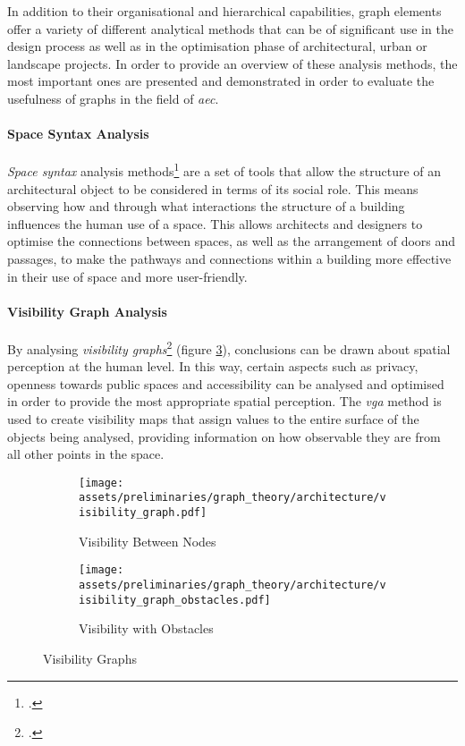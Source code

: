 \documentclass[a4paper, 12pt]{report}
\begin{document}
In addition to their organisational and hierarchical capabilities, graph elements offer a variety of different analytical methods that can be of significant use in the design process as well as in the optimisation phase of architectural, urban or landscape projects. In order to provide an overview of these analysis methods, the most important ones are presented and demonstrated in order to evaluate the usefulness of graphs in the field of \textit{\acrlong{aec}}.

\paragraph{Space Syntax Analysis}\label{par:space-syntax-analysis}

\textit{Space syntax} analysis methods\footcite{hillier1989social} are a set of tools that allow the structure of an architectural object to be considered in terms of its social role. This means observing how and through what interactions the structure of a building influences the human use of a space. This allows architects and designers to optimise the connections between spaces, as well as the arrangement of doors and passages, to make the pathways and connections within a building more effective in their use of space and more user-friendly.

\paragraph{Visibility Graph Analysis}\label{par:visibility-graph-analysis}

By analysing \textit{visibility graphs}\footcite{lee2017measuring} (figure \ref{fig:visibility-graphs}), conclusions can be drawn about spatial perception at the human level. In this way, certain aspects such as privacy, openness towards public spaces and accessibility can be analysed and optimised in order to provide the most appropriate spatial perception. The \textit{\acrfull{vga}} method is used to create visibility maps that assign values to the entire surface of the objects being analysed, providing information on how observable they are from all other points in the space.

\begin{figure}
\centering
\begin{subfigure}{.5\textwidth}
\centering
\texttt{[image: assets/preliminaries/graph\_theory/architecture/visibility\_graph.pdf]}
\caption{Visibility Between Nodes}
\label{fig:visibility-between-nodes}
\end{subfigure}%
\begin{subfigure}{.5\textwidth}
\centering
\texttt{[image: assets/preliminaries/graph\_theory/architecture/visibility\_graph\_obstacles.pdf]}
\caption{Visibility with Obstacles}
\label{fig:visibility-with-obstacles}
\end{subfigure}
\caption{Visibility Graphs}
\label{fig:visibility-graphs}
\end{figure}
\end{document}
